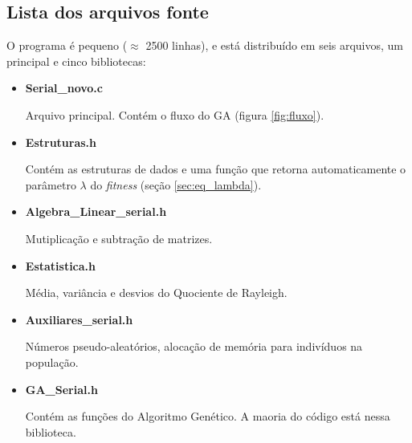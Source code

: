 \subsection{Lista dos arquivos fonte}
	
	O programa é pequeno ($\approx$ 2500 linhas), e está distribuído em seis arquivos, um principal e cinco bibliotecas:
	
	\begin{itemize}
		\item \textbf{Serial\_novo.c}
		
		Arquivo principal. Contém o fluxo do GA (figura \ref{fig:fluxo}).
		
		\item \textbf{Estruturas.h}
		
		Contém as estruturas de dados e uma função que retorna automaticamente o parâmetro $\lambda$ do \emph{fitness} (seção \ref{sec:eq_lambda}).
		
		\item \textbf{Algebra\_Linear\_serial.h}
		
		Mutiplicação e subtração de matrizes.
		
		\item \textbf{Estatistica.h}
		
		Média, variância e desvios do Quociente de Rayleigh.
		
		\item \textbf{Auxiliares\_serial.h}
		
		Números pseudo-aleatórios, alocação de memória para indivíduos na população.
		
		\item \textbf{GA\_Serial.h}
		
		Contém as funções do Algoritmo Genético. A maoria do código está nessa biblioteca.	
		
	\end{itemize}
					

